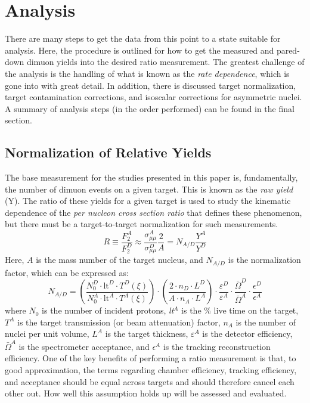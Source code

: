 \chapter{Analysis}

There are many steps to get the data from this point to a state suitable for analysis. Here, the procedure is outlined for how to get the measured and pared-down dimuon yields into the desired ratio measurement. The greatest challenge of the analysis is the handling of what is known as the \emph{rate dependence}, which is gone into with great detail. In addition, there is discussed target normalization, target contamination corrections, and isoscalar corrections for asymmetric nuclei. A summary of analysis steps (in the order performed) can be found in the final section.

\section{Normalization of Relative Yields}\label{sec:targ-to-targ-norm}

The base measurement for the studies presented in this paper is, fundamentally, the number of dimuon events on a given target. This is known as the \emph{raw yield} (Y). The ratio of these yields for a given target is used to study the kinematic dependence of the \emph{per nucleon cross section ratio} that defines these phenomenon, but there must be a target-to-target normalization for such measurements.
\begin{equation}
R \equiv \frac{F_2^A}{F_2^D} \approx \frac{\sigma_{\mu\mu}^A}{\sigma_{\mu\mu}^D} \frac{2}{A} = N_{A/D} \frac{Y^A}{Y^D}
\end{equation}
Here, $A$ is the mass number of the target nucleus, and $N_{A/D}$ is the normalization factor, which can be expressed as:
\begin{equation}
	N_{A/D} =
		\left(\frac{ N_0^D \cdot \text{lt}^D \cdot T^D(\xi)}{N_0^A \cdot \text{lt}^A \cdot T^A(\xi) } \right) \cdot 
		\left( \frac{ 2 \cdot n_D \cdot L^D }{ A \cdot n_A \cdot L^A } \right) \cdot 
		\frac{ \varepsilon^D }{ \varepsilon^A }  \cdot 
		\frac{ \bar{\Omega}^D }{\bar{ \Omega}^A } \cdot 
		\frac{ \epsilon^D }{ \epsilon^A }
\end{equation}
where $N_0$ is the number of incident protons, \emph{lt}$^A$ is the \% live time on the target, $T^A$ is the target transmission (or beam attenuation) factor, $n_A$ is the number of nuclei per unit volume, $L^A$ is the target thickness, $\varepsilon^A$ is the detector efficiency, $\bar{\Omega}^A$ is the spectrometer acceptance, and $\epsilon^A$ is the tracking reconstruction efficiency. One of the key benefits of performing a ratio measurement is that, to good approximation, the terms regarding chamber efficiency, tracking efficiency, and acceptance should be equal across targets and should therefore cancel each other out. How well this assumption holds up will be assessed and evaluated.

